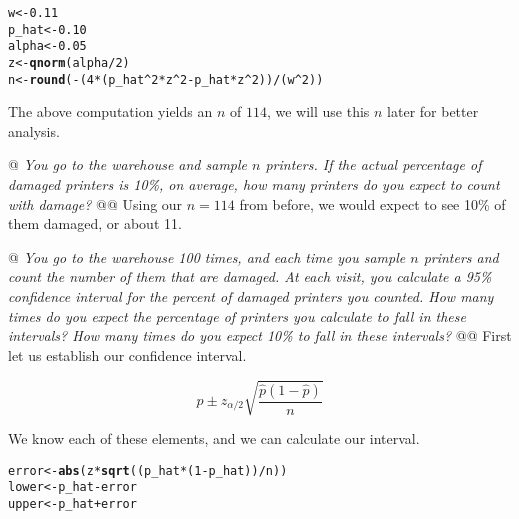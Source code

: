 \documentclass[10pt]{report}\usepackage[]{graphicx}\usepackage[]{xcolor}
\makeatletter
\newcommand{\hlnum}[1]{\textcolor[rgb]{0.686,0.059,0.569}{#1} }%
\newcommand{\hlopt}[1]{\textcolor[rgb]{0,0,0}{#1} }%
\newcommand{\hlstd}[1]{\textcolor[rgb]{0.345,0.345,0.345}{#1} }%
\newcommand{\hlkwb}[1]{\textcolor[rgb]{0.69,0.353,0.396}{#1} }%
\newcommand{\hlkwd}[1]{\textcolor[rgb]{0.737,0.353,0.396}{\textbf{#1} } }%
\newenvironment{kframe}{%
 \def\at@end@of@kframe{}%
 \ifinner\ifhmode%
  \def\at@end@of@kframe{\end{minipage} }%
  \begin{minipage}{\columnwidth}%
 \fi\fi%
 \def\FrameCommand##1{\hskip\@totalleftmargin \hskip-\fboxsep
 \colorbox{shadecolor}{##1}\hskip-\fboxsep
     \hskip-\linewidth \hskip-\@totalleftmargin \hskip\columnwidth}%
 \MakeFramed {\advance\hsize-\width
   \@totalleftmargin\z@ \linewidth\hsize
   \@setminipage} }%
 {\par\unskip\endMakeFramed%
 \at@end@of@kframe}
\newenvironment{knitrout}{}{} %
\makeatother
\begin{document}
\begin{easylist}[enumerate]
\begin{knitrout}
\color{fgcolor}\begin{kframe}
\begin{alltt}
         \hlstd{w}     \hlkwb{<-} \hlnum{0.11}
         \hlstd{p_hat} \hlkwb{<-} \hlnum{0.10}
         \hlstd{alpha} \hlkwb{<-} \hlnum{0.05}
         \hlstd{z}     \hlkwb{<-} \hlkwd{qnorm}\hlstd{(alpha} \hlopt{/} \hlnum{2}\hlstd{)}
         \hlstd{n}     \hlkwb{<-} \hlkwd{round}\hlstd{(}\hlopt{-} \hlstd{(}\hlnum{4} \hlopt{*} \hlstd{(p_hat}\hlopt{^}\hlnum{2} \hlopt{*} \hlstd{z}\hlopt{^}\hlnum{2} \hlopt{-} \hlstd{p_hat} \hlopt{*} \hlstd{z}\hlopt{^}\hlnum{2}\hlstd{))}\hlopt{/}\hlstd{(w}\hlopt{^}\hlnum{2}\hlstd{))}
\end{alltt}
\end{kframe}
\end{knitrout}


        The above computation yields an $n$ of $\boxed{114}$, we will use this $n$ later for better analysis.

        @ \textit{You go to the warehouse and sample $n$ printers. If the actual percentage of damaged printers is 10\%,
        on average, how many printers do you expect to count with damage?}
        @@ Using our $n=114$ from before, we would expect to see 10\% of them damaged, or about 11.

        @ \textit{You go to the warehouse 100 times, and each time you sample $n$ printers and count the number of them
        that are damaged. At each visit, you calculate a 95\% confidence interval for the percent of damaged printers
        you counted.  How many times do you expect the percentage of printers you calculate to fall in these intervals?
        How many times do you expect 10\% to fall in these intervals?}\newline
        @@ First let us establish our confidence interval.

        \[
            \hat{p} \pm z_{\alpha/2} \sqrt{\frac{\hat{p} (1 - \hat{p})}{n} }
        \]

        We know each of these elements, and we can calculate our interval.

\begin{knitrout}
\color{fgcolor}\begin{kframe}
\begin{alltt}
         \hlstd{error} \hlkwb{<-} \hlkwd{abs}\hlstd{(z} \hlopt{*} \hlkwd{sqrt}\hlstd{((p_hat} \hlopt{*} \hlstd{(}\hlnum{1} \hlopt{-} \hlstd{p_hat))}\hlopt{/}\hlstd{n))}
         \hlstd{lower} \hlkwb{<-} \hlstd{p_hat} \hlopt{-} \hlstd{error}
         \hlstd{upper} \hlkwb{<-} \hlstd{p_hat} \hlopt{+} \hlstd{error}
\end{alltt}
\end{kframe}
\end{knitrout}



\end{easylist}
\end{document}
